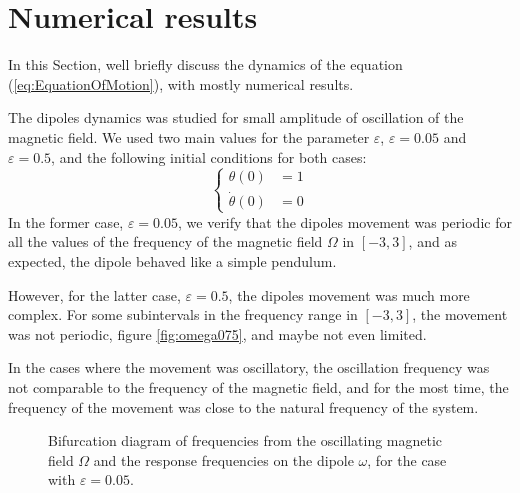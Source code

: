 \section{Numerical results}

In this Section, we\textquotesingle ll briefly discuss the dynamics of the equation (\ref{eq:EquationOfMotion}), with mostly numerical results. 

The dipole\textquotesingle s dynamics was studied for small amplitude of oscillation of the magnetic field. We used two main values for the parameter $\varepsilon$, $\varepsilon = 0.05$ and $\varepsilon = 0.5$, and the following initial conditions for both cases:
\begin{equation}
    \begin{cases}
        \theta (0) &= 1\\        
        \dot{\theta}(0) &= 0
    \end{cases}
\end{equation} 
In the former case, $\varepsilon = 0.05$, we verify that the dipole\textquotesingle s movement was periodic for all the values of the frequency of the magnetic field $\Omega$ in $[-3,3]$, and as expected, the dipole behaved like a simple pendulum. 

However, for the latter case, $\varepsilon = 0.5$, the dipole\textquotesingle s movement was much more complex. For some subintervals in the frequency range in $[-3,3]$, the movement was not periodic, figure \ref{fig:omega075}, and maybe not even limited. 

In the cases where the movement was oscillatory, the oscillation frequency was not comparable to the frequency of the magnetic field, and for the most time, the frequency of the movement was close to the natural frequency of the system. 

\begin{figure}
    \centering
    \scalebox{0.66}{}
    \caption{Bifurcation diagram of frequencies from the oscillating magnetic field $\Omega$ and the response frequencies on the dipole $\omega$, for the case with $\varepsilon = 0.05$.}
    \label{fig:bif005}
\end{figure}

